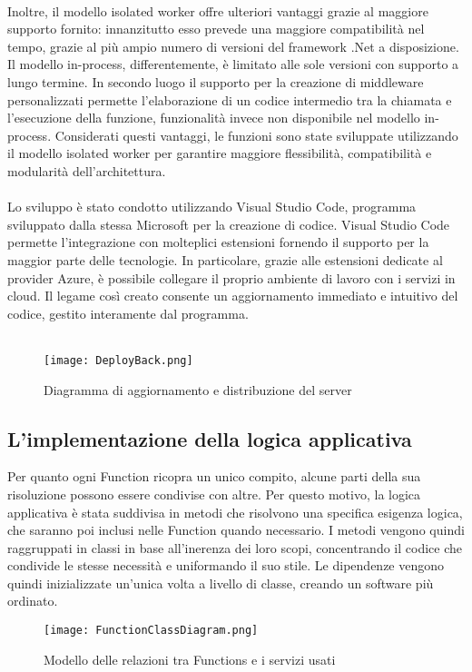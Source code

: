 \\
Inoltre, il modello isolated worker offre ulteriori vantaggi grazie al maggiore supporto fornito:
innanzitutto esso prevede una maggiore compatibilità nel tempo,
grazie al più ampio numero di versioni del framework .Net a disposizione.
Il modello in-process, differentemente, è limitato alle sole versioni con supporto a lungo termine.
In secondo luogo il supporto per la creazione di middleware personalizzati
permette l'elaborazione di un codice intermedio tra la chiamata e l’esecuzione della funzione,
funzionalità invece non disponibile nel modello in-process.
Considerati questi vantaggi, le funzioni sono state sviluppate utilizzando il modello isolated worker
per garantire maggiore flessibilità, compatibilità e modularità dell’architettura.\\
\\
Lo sviluppo è stato condotto utilizzando Visual Studio Code,
programma sviluppato dalla stessa Microsoft per la creazione di codice.
Visual Studio Code permette l'integrazione con molteplici estensioni fornendo il supporto
per la maggior parte delle tecnologie.
In particolare, grazie alle estensioni dedicate al provider Azure,
è possibile collegare il proprio ambiente di lavoro con i servizi in cloud.
Il legame così creato consente un aggiornamento immediato e intuitivo del codice,
gestito interamente dal programma.\\
\\
\begin{figure}[h!]
    \begin{center}
        \texttt{[image: DeployBack.png]}
        \caption{Diagramma di aggiornamento e distribuzione del server}
    \end{center}
\end{figure}

\clearpage


\subsection{L'implementazione della logica applicativa}
Per quanto ogni Function ricopra un unico compito,
alcune parti della sua risoluzione possono essere condivise con altre.
Per questo motivo,
la logica applicativa è stata suddivisa in metodi che risolvono una specifica esigenza logica,
che saranno poi inclusi nelle Function quando necessario.
I metodi vengono quindi raggruppati in classi in base all'inerenza dei loro scopi,
concentrando il codice che condivide le stesse necessità e uniformando il suo stile.
Le dipendenze vengono quindi inizializzate un'unica volta a livello di classe,
creando un software più ordinato.\\
\begin{figure}[h!]
    \begin{center}
        \texttt{[image: FunctionClassDiagram.png]}
        \caption{Modello delle relazioni tra Functions e i servizi usati}
    \end{center}
\end{figure}

